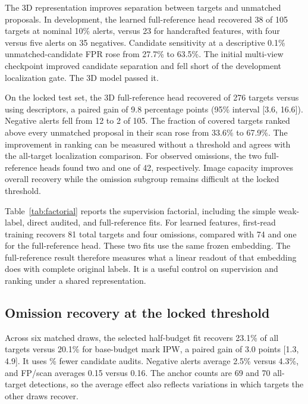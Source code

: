 The 3D representation improves separation between targets and unmatched proposals. In development, the learned full-reference head recovered 38 of 105 targets at nominal 10\% alerts, versus 23 for handcrafted features, with four versus five alerts on 35 negatives. Candidate sensitivity at a descriptive 0.1\% unmatched-candidate FPR rose from 27.7\% to 63.5\%. The initial multi-view checkpoint improved candidate separation and fell short of the development localization gate. The 3D model passed it.

On the locked test set, the 3D full-reference head recovered \OriginalLearned{} of 276 targets versus \OriginalDescriptor{} using descriptors, a paired gain of 9.8 percentage points (95\% interval [3.6, 16.6]). Negative alerts fell from 12 to 2 of 105. The fraction of covered targets ranked above every unmatched proposal in their scan rose from 33.6\% to 67.9\%. The improvement in ranking can be measured without a threshold and agrees with the all-target localization comparison. For observed omissions, the two full-reference heads found two and one of 42, respectively. Image capacity improves overall recovery while the omission subgroup remains difficult at the locked threshold.

\begin{table}[t]
\centering\small
\setlength{\tabcolsep}{3.5pt}
\caption{\textbf{Representation and supervision at the locked anchor.} Each cell reports recovered omissions out of 42, recovered targets out of 276, and alerts out of 105 negative patients. Audited methods share the base mark-stratified draw.}
\label{tab:factorial}

\end{table}

Table~\ref{tab:factorial} reports the supervision factorial, including the simple weak-label, direct audited, and full-reference fits. For learned features, first-read training recovers 81 total targets and four omissions, compared with 74 and one for the full-reference head. These two fits use the same frozen embedding. The full-reference result therefore measures what a linear readout of that embedding does with complete original labels. It is a useful control on supervision and ranking under a shared representation.

\subsection{Omission recovery at the locked threshold}

Across six matched draws, the selected half-budget fit recovers 23.1\% of all targets versus 20.1\% for base-budget mark IPW, a paired gain of 3.0 points [1.3, 4.9]. It uses \AuditSave\% fewer candidate audits. Negative alerts average 2.5\% versus 4.3\%, and FP/scan averages 0.15 versus 0.16. The anchor counts are 69 and 70 all-target detections, so the average effect also reflects variations in which targets the other draws recover.

